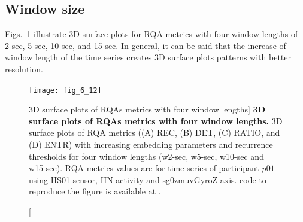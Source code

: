 \subsection{Window size}
Figs.~\ref{fig:topo_windows} illustrate 3D surface plots for RQA metrics 
with four window lengths of 2-sec, 5-sec, 10-sec, and 15-sec.
In general, it can be said that the increase of window length 
of the time series creates 3D surface plots patterns with better resolution.
\begin{figure}
\centering
\texttt{[image: fig\_6\_12]}
    \caption
	[3D surface plots of RQAs metrics with four window lengths]{
	{\bf 3D surface plots of RQAs metrics with four window lengths.}
	3D surface plots of RQA metrics ((A) REC, (B) DET, (C) RATIO, and (D) ENTR) 
	with increasing embedding 
	parameters and recurrence thresholds for four window 
	lengths (w2-sec, w5-sec, w10-sec and w15-sec).
	RQA metrics values are for time series of participant $p01$ 
	using HS01 sensor, HN activity and sg0zmuvGyroZ axis.
	\R code to reproduce the figure is available at 
	.
	}
\label{fig:topo_windows}
\end{figure}

\newpage
